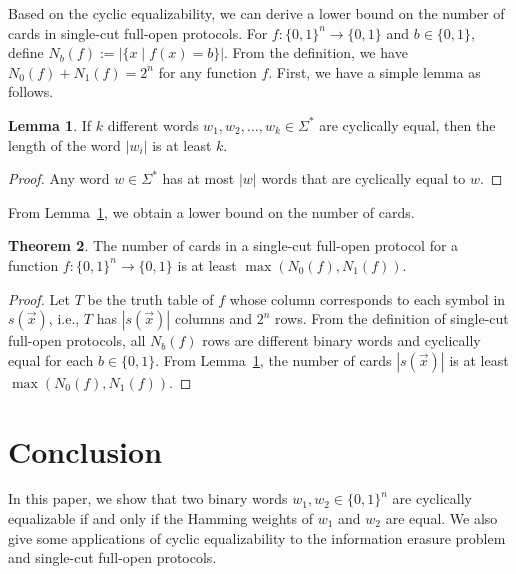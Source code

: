 \documentclass{article}
\theoremstyle{definition}
\newtheorem{theorem}{Theorem}[section]
\newtheorem{lemma}[theorem]{Lemma}
\newcommand{\bin}{\{0,1\}}
\newcommand{\ra}{\rightarrow}
\begin{document}
Based on the cyclic equalizability, we can derive a lower bound on the number of cards in single-cut full-open protocols. 
For $f\colon \bin^n \ra \bin$ and $b \in \bin$, define $N_b(f) := |\{x \mid f(x) = b\}|$. 
From the definition, we have $N_0(f) + N_1(f) = 2^n$ for any function $f$. 
First, we have a simple lemma as follows. 

\begin{lemma}\label{lemma:cyclic_num}
If $k$ different words $w_1, w_2, \ldots, w_k \in \Sigma^*$ are cyclically equal, then the length of the word $|w_i|$ is at least $k$. 
\end{lemma}

\begin{proof}
Any word $w \in \Sigma^*$ has at most $|w|$ words that are cyclically equal to $w$.
\end{proof}

From Lemma~\ref{lemma:cyclic_num}, we obtain a lower bound on the number of cards. 

\begin{theorem}
The number of cards in a single-cut full-open protocol for a function $f\colon \bin^n \ra \bin$ is at least $\max(N_0(f), N_1(f))$. 
\end{theorem}

\begin{proof}
Let $T$ be the truth table of $f$ whose column corresponds to each symbol in $s(\vec{x})$, i.e., $T$ has $|s(\vec{x})|$ columns and $2^n$ rows. 
From the definition of single-cut full-open protocols, all $N_b(f)$ rows are different binary words and cyclically equal for each $b \in \bin$. 
From Lemma~\ref{lemma:cyclic_num}, the number of cards $|s(\vec{x})|$ is at least $\max(N_0(f), N_1(f))$. 
\end{proof}

\section{Conclusion}

In this paper, we show that two binary words $w_1, w_2 \in \bin^n$ are cyclically equalizable if and only if the Hamming weights of $w_1$ and $w_2$ are equal. 
We also give some applications of cyclic equalizability to the information erasure problem and single-cut full-open protocols. 
\end{document}
